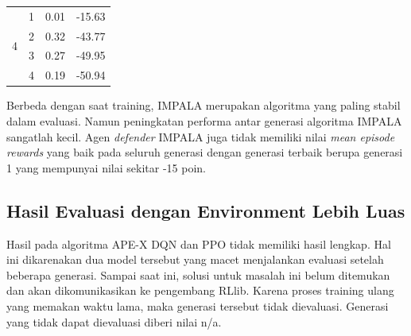 \begin{table}[H]
\begin{tabular}{|c|c|l|l|}
  \multirow{4}{*}{4}                                                           & 1                                                                            & 0.01                                                                             & -15.63                                                                           \\ \cline{2-4} 
                                                                               & 2                                                                            & 0.32                                                                             & -43.77                                                                           \\ \cline{2-4} 
                                                                               & 3                                                                            & 0.27                                                                             & -49.95                                                                           \\ \cline{2-4} 
                                                                               & 4                                                                            & 0.19                                                                             & -50.94                                                                           \\ \hline
  \end{tabular}
\end{table}

Berbeda dengan saat training, IMPALA merupakan algoritma yang paling stabil dalam evaluasi.
Namun peningkatan performa antar generasi algoritma IMPALA sangatlah kecil.
Agen \emph{defender} IMPALA juga tidak memiliki nilai \emph{mean episode rewards} yang baik pada seluruh generasi
dengan generasi terbaik berupa generasi 1 yang mempunyai nilai sekitar -15 poin.

\subsection{Hasil Evaluasi dengan Environment Lebih Luas}

Hasil pada algoritma APE-X DQN dan PPO tidak memiliki hasil lengkap. 
Hal ini dikarenakan dua model tersebut yang macet menjalankan evaluasi setelah beberapa generasi.
Sampai saat ini, solusi untuk masalah ini belum ditemukan dan akan dikomunikasikan ke pengembang RLlib.
Karena proses training ulang yang memakan waktu lama, maka generasi tersebut tidak dievaluasi.
Generasi yang tidak dapat dievaluasi diberi nilai n/a.

